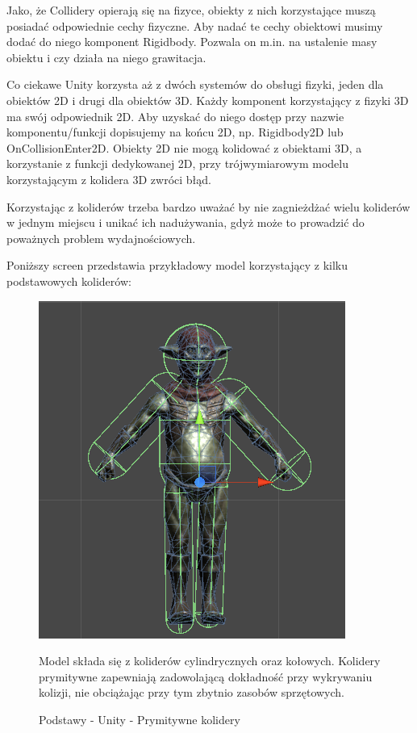 \documentclass[openright]{xmgr}
\begin{document}
Jako, że Collidery opierają się na fizyce, obiekty z nich korzystające muszą posiadać odpowiednie cechy fizyczne. Aby nadać te cechy obiektowi musimy dodać do niego komponent Rigidbody. Pozwala on m.in. na ustalenie masy obiektu i czy działa na niego grawitacja.

Co ciekawe Unity korzysta aż z dwóch systemów do obsługi fizyki, jeden dla obiektów 2D i drugi dla obiektów 3D. Każdy komponent korzystający z fizyki 3D ma swój odpowiednik 2D. Aby uzyskać do niego dostęp przy nazwie komponentu/funkcji dopisujemy na końcu 2D, np. Rigidbody2D lub OnCollisionEnter2D. Obiekty 2D nie mogą kolidować z obiektami 3D, a korzystanie z funkcji dedykowanej 2D, przy trójwymiarowym modelu korzystającym z kolidera 3D zwróci błąd.

Korzystając z koliderów trzeba bardzo uważać by nie zagnieżdżać wielu koliderów w jednym miejscu i unikać ich nadużywania, gdyż może to prowadzić do poważnych problem wydajnościowych.

Poniższy screen przedstawia przykładowy model korzystający z kilku podstawowych koliderów:

\begin{figure}[!htb]
    \begin{center}
    \includegraphics[scale=0.25]{Screeny/rodzial5screeny/model_prymitywne_kolidery}
    \end{center}
    \caption{Podstawy - Unity - Prymitywne kolidery}
Model składa się z koliderów cylindrycznych oraz kołowych. Kolidery prymitywne zapewniają zadowolającą dokładność przy wykrywaniu kolizji, nie obciążając przy tym zbytnio zasobów sprzętowych.
\end{figure}
\end{document}
